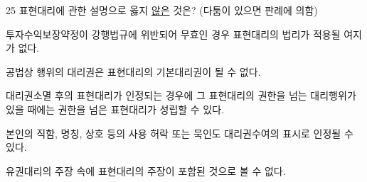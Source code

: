 \begin{question}{25}
표현대리에 관한 설명으로 옳지 \uline{않은} 것은? (다툼이 있으면 판례에 의함)
\begin{choices}
  \item 투자수익보장약정이 강행법규에 위반되어 무효인 경우 표현대리의 법리가 적용될 여지가 없다.
  \item 공법상 행위의 대리권은 표현대리의 기본대리권이 될 수 없다.
  \item 대리권소멸 후의 표현대리가 인정되는 경우에 그 표현대리의 권한을 넘는 대리행위가 있을 때에는 권한을 넘은 표현대리가 성립할 수 있다.
  \item 본인의 직함, 명칭, 상호 등의 사용 허락 또는 묵인도 대리권수여의 표시로 인정될 수 있다.
  \item 유권대리의 주장 속에 표현대리의 주장이 포함된 것으로 볼 수 없다.
\end{choices}
\end{question}
